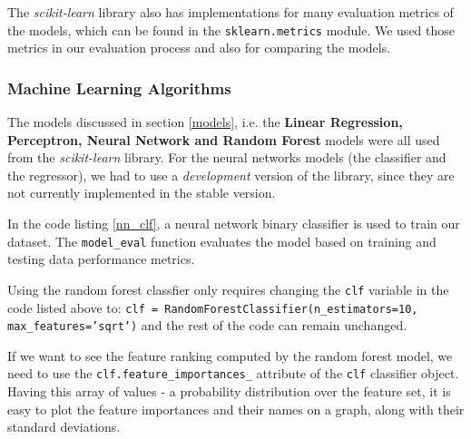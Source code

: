The {\it scikit-learn} library also has implementations for many evaluation 
metrics of the models, which can be found in the \texttt{sklearn.metrics} 
module. We used those metrics in our evaluation process and also for comparing the 
models.

\subsubsection{Machine Learning Algorithms}

The models discussed in section \ref{models}, i.e. the {\bf Linear Regression, 
Perceptron, Neural Network and Random Forest} models were all used from the 
{\it scikit-learn} library. For the neural networks models (the classifier and 
the regressor), we had to use a {\it development} version of the library, since 
they are not currently implemented in the stable version. 

In the code listing \ref{nn_clf}, a neural network binary classifier is used 
to train our dataset. The \texttt{model\_eval} function evaluates the model 
based on training and testing data performance metrics. 



Using the random forest classfier only requires changing the \texttt{clf} 
variable in the code listed above to: \texttt{clf = RandomForestClassifier(n\_estimators=10, 
max\_features='sqrt')} and the rest of the code can remain unchanged. 

If we want to see the feature ranking computed by the random forest model, we 
need to use the \texttt{clf.feature\_importances\_} attribute of the \texttt{clf} 
classifier object. Having this array of values - a probability distribution over 
the feature set, it is easy to plot the feature importances and their names on 
a graph, along with their standard deviations. 